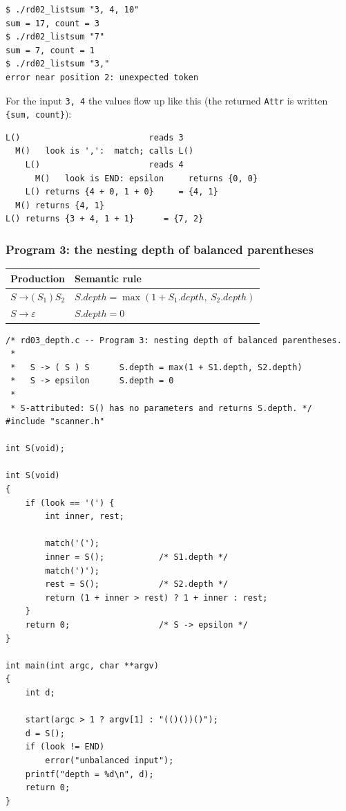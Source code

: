 \documentclass[11pt,a4paper]{article}
\newcommand{\at}[2]{\ensuremath{#1.\mathit{#2}}}
\newcommand{\tok}[1]{\ensuremath{\mathtt{#1}}}
\begin{document}
\begin{lstlisting}[basicstyle=\ttfamily\footnotesize,tabsize=4]
$ ./rd02_listsum "3, 4, 10"
sum = 17, count = 3
$ ./rd02_listsum "7"
sum = 7, count = 1
$ ./rd02_listsum "3,"
error near position 2: unexpected token
\end{lstlisting}

For the input \texttt{3, 4} the values flow up like this (the returned \texttt{Attr} is written \texttt{\{sum, count\}}):
\begin{lstlisting}[basicstyle=\ttfamily\footnotesize]
L()                          reads 3
  M()   look is ',':  match; calls L()
    L()                      reads 4
      M()   look is END: epsilon     returns {0, 0}
    L() returns {4 + 0, 1 + 0}     = {4, 1}
  M() returns {4, 1}
L() returns {3 + 4, 1 + 1}      = {7, 2}
\end{lstlisting}

\subsubsection*{Program 3: the nesting depth of balanced parentheses}
\begin{center}
\small
\begin{tabular}{@{}l l@{}}
\toprule
\textbf{Production} & \textbf{Semantic rule} \\ \midrule
$S \to \tok{(}\ S_1\ \tok{)}\ S_2$ & $\at{S}{depth}=\max(1+\at{S_1}{depth},\ \at{S_2}{depth})$ \\
$S \to \varepsilon$ & $\at{S}{depth}=0$ \\ \bottomrule
\end{tabular}
\end{center}

\begin{lstlisting}[basicstyle=\ttfamily\footnotesize,tabsize=4]
/* rd03_depth.c -- Program 3: nesting depth of balanced parentheses.
 *
 *   S -> ( S ) S      S.depth = max(1 + S1.depth, S2.depth)
 *   S -> epsilon      S.depth = 0
 *
 * S-attributed: S() has no parameters and returns S.depth. */
#include "scanner.h"

int S(void);

int S(void)
{
    if (look == '(') {
        int inner, rest;

        match('(');
        inner = S();           /* S1.depth */
        match(')');
        rest = S();            /* S2.depth */
        return (1 + inner > rest) ? 1 + inner : rest;
    }
    return 0;                  /* S -> epsilon */
}

int main(int argc, char **argv)
{
    int d;

    start(argc > 1 ? argv[1] : "(()())()");
    d = S();
    if (look != END)
        error("unbalanced input");
    printf("depth = %d\n", d);
    return 0;
}
\end{lstlisting}
\end{document}
